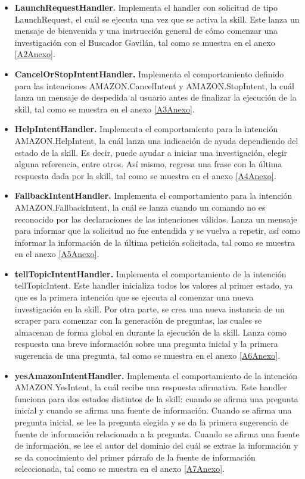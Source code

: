 \begin{itemize}
  \item \textbf{LaunchRequestHandler.} Implementa el handler con solicitud de tipo LaunchRequest, el cuál se ejecuta una vez que se activa la skill. Este lanza un mensaje de bienvenida y una instrucción general de cómo comenzar una investigación con el Buscador Gavilán, tal como se muestra en el anexo \ref{A2Anexo}.
  \item \textbf{CancelOrStopIntentHandler.} Implementa el comportamiento definido para las intenciones AMAZON.CancelIntent y AMAZON.StopIntent, la cuál lanza un mensaje de despedida al usuario antes de finalizar la ejecución de la skill, tal como se muestra en el anexo \ref{A3Anexo}.
  \item \textbf{HelpIntentHandler.} Implementa el comportamiento para la intención AMAZON.HelpIntent, la cuál lanza una indicación de ayuda dependiendo del estado de la skill. Es decir, puede ayudar a iniciar una investigación, elegir alguna referencia, entre otros. Así mismo, regresa una frase con la última respuesta dada por la skill, tal como se muestra en el anexo \ref{A4Anexo}.
  \item \textbf{FallbackIntentHandler.} Implementa el comportamiento para la intención AMAZON.FallbackIntent, la cuál se lanza cuando un comando no es reconocido por las declaraciones de las intenciones válidas. Lanza un mensaje para informar que la solicitud no fue entendida y se vuelva a repetir, así como informar la información de la última petición solicitada, tal como se muestra en el anexo \ref{A5Anexo}.
  \item \textbf{tellTopicIntentHandler.} Implementa el comportamiento de la intención tellTopicIntent. Este handler inicializa todos los valores al primer estado, ya que es la primera intención que se ejecuta al comenzar una nueva investigación en la skill. Por otra parte, se crea una nueva instancia de un scraper para comenzar con la generación de preguntas, las cuales se almacenan de forma global en durante la ejecución de la skill. Lanza como respuesta una breve información sobre una pregunta inicial y la primera sugerencia de una pregunta, tal como se muestra en el anexo \ref{A6Anexo}.
  \item \textbf{yesAmazonIntentHandler.} Implementa el comportamiento de la intención AMAZON.YesIntent, la cuál recibe una respuesta afirmativa. Este handler funciona para dos estados distintos de la skill: cuando se afirma una pregunta inicial y cuando se afirma una fuente de información. Cuando se afirma una pregunta inicial, se lee la pregunta elegida y se da la primera sugerencia de fuente de información relacionada a la pregunta. Cuando se afirma una fuente de información, se lee el autor del dominio del cuál se extrae la información y se da conocimiento del primer párrafo de la fuente de información seleccionada, tal como se muestra en el anexo \ref{A7Anexo}.

\end{itemize}
